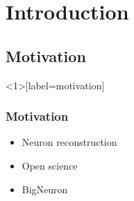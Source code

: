 \documentclass{beamer}
\begin{document}

\frame{\titlepage}


\section{Introduction}
\subsection{Motivation}
\begin{frame}<1>[label=motivation]\frametitle{Motivation}
\begin{itemize}
	\item<1-> Neuron reconstruction
	\item<2-> Open science
	\item<3-> BigNeuron
\end{itemize}
\end{frame}
\end{document}
